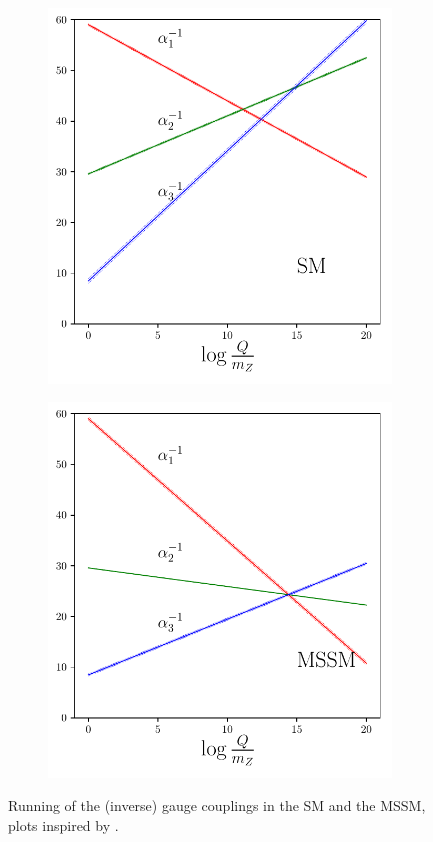 \begin{figure}[t]
\hfill
	\begin{subfigure}
		\centering
	\includegraphics[scale = 0.55]{figures/dgut-1}
	\end{subfigure}
	\hfill
	\begin{subfigure}
		\centering
	\includegraphics[scale = 0.55]{figures/dgut-2}
	\hfill
	\end{subfigure}
\caption{Running of the (inverse) gauge couplings in the SM and the MSSM, plots inspired by \cite{Kazakov2000}.}
\label{fig:runnings}
\end{figure}








